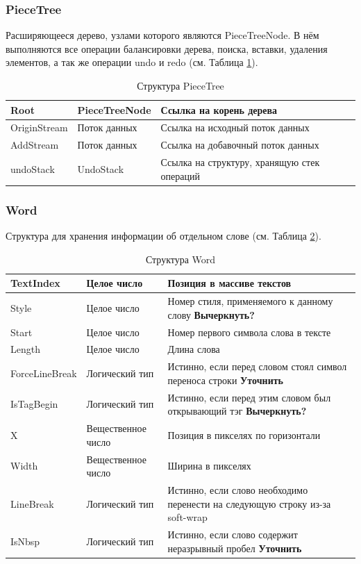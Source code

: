 \documentclass{fefu}
\begin{document}
			\subsubsection{PieceTree}
				\par Расширяющееся дерево, узлами которого являются
				PieceTreeNode. В нём выполняются все операции балансировки дерева, поиска,
				вставки, удаления элементов, а так же операции undo и redo (см. Таблица 
				\ref{table:PieceTree}).
				\begin{table}[H]
					\centering
					\begin{tabular}{|l|l|p{10cm}|}
						\hline
						Root & PieceTreeNode & Ссылка на корень дерева \\
						\hline
						OriginStream & Поток данных & Ссылка на исходный поток данных \\
						\hline
						AddStream & Поток данных & Ссылка на добавочный поток данных \\
						\hline
						undoStack & UndoStack & Ссылка на структуру, хранящую стек операций \\
						\hline
					\end{tabular}
					\caption{Структура PieceTree}
					\label{table:PieceTree}
				\end{table}
			\subsubsection{Word}
				\par Структура для хранения информации об отдельном слове (см. Таблица 
				\ref{table:Word}).
				\begin{table}[h]
					\centering
					\begin{tabular}{|l|l|p{9cm}|}
						\hline
						TextIndex & Целое число & Позиция в массиве текстов \\
						\hline
						Style & Целое число & Номер стиля, применяемого к данному слову 
						\textbf{Вычеркнуть?} \\
						\hline
						Start & Целое число & Номер первого символа слова в тексте \\
						\hline
						Length & Целое число & Длина слова \\
						\hline
						ForceLineBreak & Логический тип & Истинно, если перед словом стоял
						символ переноса строки \textbf{Уточнить}\\
						\hline
						IsTagBegin & Логический тип & Истинно, если перед этим словом был
						открывающий тэг \textbf{Вычеркнуть?} \\
						\hline 
						X & Вещественное число & Позиция в пикселях по горизонтали \\
						\hline 
						Width & Вещественное число & Ширина в пикселях \\
						\hline
						LineBreak & Логический тип & Истинно, если слово необходимо перенести
						на следующую строку из-за soft-wrap \\
						\hline
						IsNbsp & Логический тип & Истинно, если слово содержит неразрывный
						пробел \textbf{Уточнить} \\
						\hline
					\end{tabular}
					\caption{Структура Word}
					\label{table:Word}
				\end{table}
\end{document}
